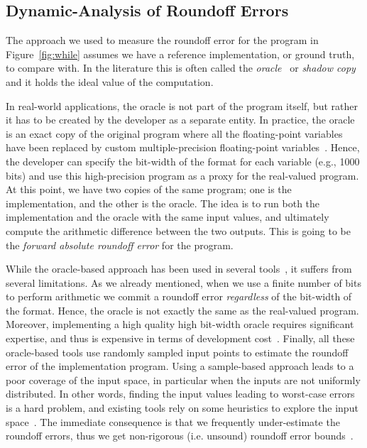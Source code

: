 \subsection{Dynamic-Analysis of Roundoff Errors}
%
The approach we used to measure the roundoff error for the program in Figure~\ref{fig:while} assumes we have a reference implementation, or ground truth, to compare with.
%
In the literature this is often called the \emph{oracle}~\cite{blame} or \emph{shadow copy}~\cite{shadow} and it holds the ideal value of the computation.
%
% 

In real-world applications, the oracle is not part of the program itself, but rather it has to be created by the developer as a separate entity.
%
In practice, the oracle is an exact copy of the original program where all the floating-point variables have been replaced by custom multiple-precision floating-point variables~\cite{mpfr}.
%
Hence, the developer can specify the bit-width of the format for each variable (e.g., 1000 bits) and use this high-precision program as a proxy for the real-valued program.
%
At this point, we have two copies of the same program; one is the implementation, and the other is the oracle. 
%
The idea is to run both the implementation and the oracle with the same input values, and ultimately compute the arithmetic difference between the two outputs. 
%
This is going to be the \emph{forward absolute roundoff error} for the program. 
%

While the oracle-based approach has been used in several tools~\cite{landau2014guide, kahan1996improbability, atomic, blame, herbie}, it suffers from several limitations.
%
As we already mentioned, when we use a finite number of bits to perform arithmetic we commit a roundoff error \emph{regardless} of the bit-width of the format.
%
Hence, the oracle is not exactly the same as the real-valued program.
%
%
Moreover, implementing a high quality high bit-width oracle requires significant expertise, and thus is expensive in terms of development cost~\cite{atomic}.
%
Finally, all these oracle-based tools use randomly sampled input points to estimate the roundoff error of the implementation program.
%
Using a sample-based approach leads to a poor coverage of the input space, in particular when the inputs are not uniformly distributed.
%
In other words, finding the input values leading to worst-case errors is a hard problem, and existing tools rely on some heuristics to explore the input space~\cite{dynamic}. 
%
The immediate consequence is that we frequently under-estimate the roundoff errors, thus we get non-rigorous (i.e. unsound) roundoff error bounds~\cite{glasserman2013monte, parker2000monte, herbie}.
%

